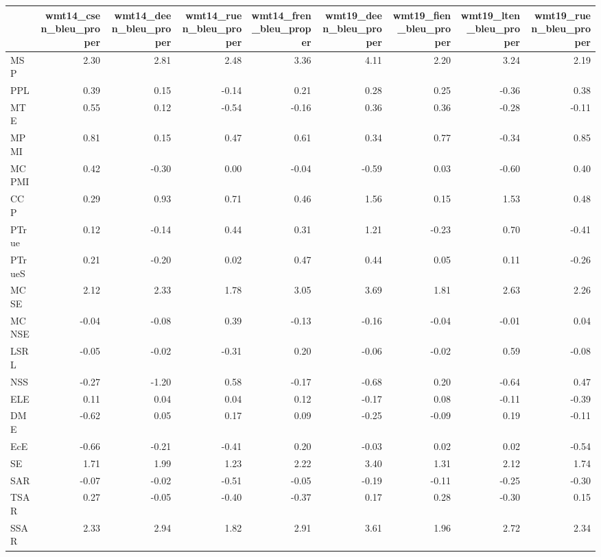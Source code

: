 \begin{tabular}{lrrrrrrrr}
\toprule
 & wmt14\_csen\_bleu\_proper & wmt14\_deen\_bleu\_proper & wmt14\_ruen\_bleu\_proper & wmt14\_fren\_bleu\_proper & wmt19\_deen\_bleu\_proper & wmt19\_fien\_bleu\_proper & wmt19\_lten\_bleu\_proper & wmt19\_ruen\_bleu\_proper \\
\midrule
MSP & 2.30 & 2.81 & 2.48 & 3.36 & 4.11 & 2.20 & 3.24 & 2.19 \\
PPL & 0.39 & 0.15 & -0.14 & 0.21 & 0.28 & 0.25 & -0.36 & 0.38 \\
MTE & 0.55 & 0.12 & -0.54 & -0.16 & 0.36 & 0.36 & -0.28 & -0.11 \\
MPMI & 0.81 & 0.15 & 0.47 & 0.61 & 0.34 & 0.77 & -0.34 & 0.85 \\
MCPMI & 0.42 & -0.30 & 0.00 & -0.04 & -0.59 & 0.03 & -0.60 & 0.40 \\
CCP & 0.29 & 0.93 & 0.71 & 0.46 & 1.56 & 0.15 & 1.53 & 0.48 \\
PTrue & 0.12 & -0.14 & 0.44 & 0.31 & 1.21 & -0.23 & 0.70 & -0.41 \\
PTrueS & 0.21 & -0.20 & 0.02 & 0.47 & 0.44 & 0.05 & 0.11 & -0.26 \\
MCSE & 2.12 & 2.33 & 1.78 & 3.05 & 3.69 & 1.81 & 2.63 & 2.26 \\
MCNSE & -0.04 & -0.08 & 0.39 & -0.13 & -0.16 & -0.04 & -0.01 & 0.04 \\
LSRL & -0.05 & -0.02 & -0.31 & 0.20 & -0.06 & -0.02 & 0.59 & -0.08 \\
NSS & -0.27 & -1.20 & 0.58 & -0.17 & -0.68 & 0.20 & -0.64 & 0.47 \\
ELE & 0.11 & 0.04 & 0.04 & 0.12 & -0.17 & 0.08 & -0.11 & -0.39 \\
DME & -0.62 & 0.05 & 0.17 & 0.09 & -0.25 & -0.09 & 0.19 & -0.11 \\
EcE & -0.66 & -0.21 & -0.41 & 0.20 & -0.03 & 0.02 & 0.02 & -0.54 \\
SE & 1.71 & 1.99 & 1.23 & 2.22 & 3.40 & 1.31 & 2.12 & 1.74 \\
SAR & -0.07 & -0.02 & -0.51 & -0.05 & -0.19 & -0.11 & -0.25 & -0.30 \\
TSAR & 0.27 & -0.05 & -0.40 & -0.37 & 0.17 & 0.28 & -0.30 & 0.15 \\
SSAR & 2.33 & 2.94 & 1.82 & 2.91 & 3.61 & 1.96 & 2.72 & 2.34 \\
\bottomrule
\end{tabular}

